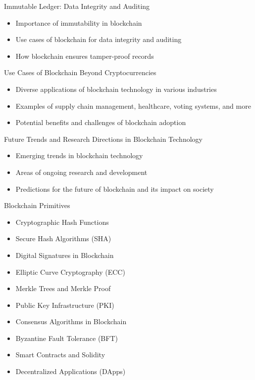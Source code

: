 \begin{frame}{Immutable Ledger: Data Integrity and Auditing}
    \begin{itemize}
        \item Importance of immutability in blockchain
        \item Use cases of blockchain for data integrity and auditing
        \item How blockchain ensures tamper-proof records
    \end{itemize}
\end{frame}

\begin{frame}{Use Cases of Blockchain Beyond Cryptocurrencies}
    \begin{itemize}
        \item Diverse applications of blockchain technology in various industries
        \item Examples of supply chain management, healthcare, voting systems, and more
        \item Potential benefits and challenges of blockchain adoption
    \end{itemize}
\end{frame}

\begin{frame}{Future Trends and Research Directions in Blockchain Technology}
    \begin{itemize}
        \item Emerging trends in blockchain technology
        \item Areas of ongoing research and development
        \item Predictions for the future of blockchain and its impact on society
    \end{itemize}
\end{frame}

\begin{frame}{Blockchain Primitives}
    \begin{itemize}
        \item Cryptographic Hash Functions
        \item Secure Hash Algorithms (SHA)
        \item Digital Signatures in Blockchain
        \item Elliptic Curve Cryptography (ECC)
        \item Merkle Trees and Merkle Proof
        \item Public Key Infrastructure (PKI)
        \item Consensus Algorithms in Blockchain
        \item Byzantine Fault Tolerance (BFT)
        \item Smart Contracts and Solidity
        \item Decentralized Applications (DApps)
    \end{itemize}
\end{frame}

